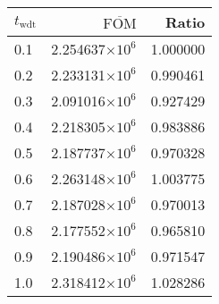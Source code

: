 \begin{tabular}{lrr}
\toprule
$t_{\mathrm{wdt}}$ & $\overline{\mathrm{FOM}}$ &    Ratio \\
\midrule
               0.1 &   2.254637$\times 10^{6}$ & 1.000000 \\
               0.2 &   2.233131$\times 10^{6}$ & 0.990461 \\
               0.3 &   2.091016$\times 10^{6}$ & 0.927429 \\
               0.4 &   2.218305$\times 10^{6}$ & 0.983886 \\
               0.5 &   2.187737$\times 10^{6}$ & 0.970328 \\
               0.6 &   2.263148$\times 10^{6}$ & 1.003775 \\
               0.7 &   2.187028$\times 10^{6}$ & 0.970013 \\
               0.8 &   2.177552$\times 10^{6}$ & 0.965810 \\
               0.9 &   2.190486$\times 10^{6}$ & 0.971547 \\
               1.0 &   2.318412$\times 10^{6}$ & 1.028286 \\
\bottomrule
\end{tabular}
